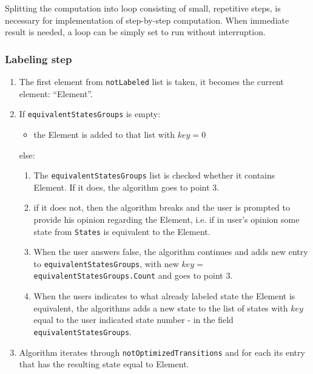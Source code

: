\documentclass{article}
\begin{document}
Splitting the computation into loop consisting of small, repetitive steps, is necessary for
implementation of step-by-step computation. When immediate result is needed, a loop can be simply
set to run without interruption.

\subsubsection*{Labeling step}

\begin{enumerate}

  \item The first element from \verb|notLabeled| list is taken, it becomes the current element:
  ``Element''.

  \item If \verb|equivalentStatesGroups| is empty:

  \begin{itemize}
    \item the Element is added to that list with $key = 0$
  \end{itemize}

  else:

  \begin{enumerate}

    \item The \verb|equivalentStatesGroups| list is checked whether it contains Element. If it does,
    the algorithm goes to point 3.

    \item if it does not, then the algorithm breaks and the user is prompted to provide his opinion
    regarding the Element, i.e. if in user's opinion some state from \verb|States| is equivalent to
    the Element.

    \item When the user answers false, the algorithm continues and adds new entry to
    \verb|equivalentStatesGroups|, with new $key = $\verb|equivalentStatesGroups.Count| and goes to point 3.

    \item When the users indicates to what already labeled state the Element is equivalent, the
    algorithms adds a new state to the list of states with $key$ equal to the user indicated state
    number - in the field \verb|equivalentStatesGroups|.

  \end{enumerate}

  \item Algorithm iterates through \verb|notOptimizedTransitions| and for each its entry that has
  the resulting state equal to Element.


\end{enumerate}
\end{document}
